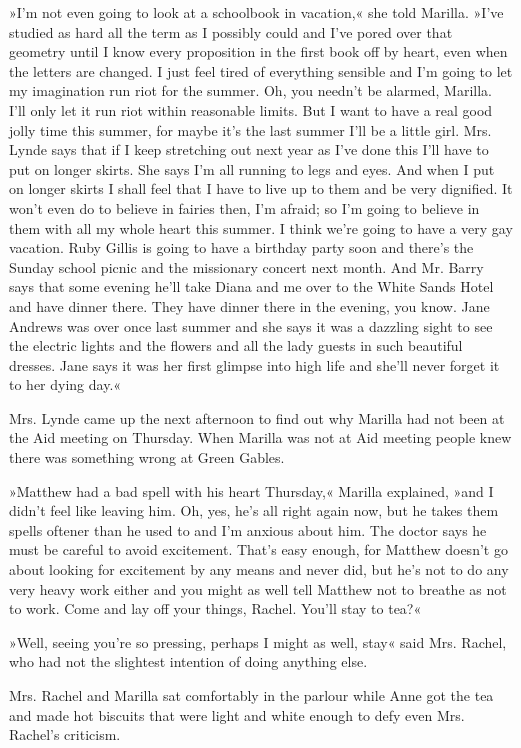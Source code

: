 »I’m not even going to look at a schoolbook in vacation,« she told Marilla. »I’ve studied as hard all the term as I possibly could and I’ve pored over that geometry until I know every proposition in the first book off by heart, even when the letters are changed. I just feel tired of everything sensible and I’m going to let my imagination run riot for the summer. Oh, you needn’t be alarmed, Marilla. I’ll only let it run riot within reasonable limits. But I want to have a real good jolly time this summer, for maybe it’s the last summer I’ll be a little girl. Mrs. Lynde says that if I keep stretching out next year as I’ve done this I’ll have to put on longer skirts. She says I’m all running to legs and eyes. And when I put on longer skirts I shall feel that I have to live up to them and be very dignified. It won’t even do to believe in fairies then, I’m afraid; so I’m going to believe in them with all my whole heart this summer. I think we’re going to have a very gay vacation. Ruby Gillis is going to have a birthday party soon and there’s the Sunday school picnic and the missionary concert next month. And Mr. Barry says that some evening he’ll take Diana and me over to the White Sands Hotel and have dinner there. They have dinner there in the evening, you know. Jane Andrews was over once last summer and she says it was a dazzling sight to see the electric lights and the flowers and all the lady guests in such beautiful dresses. Jane says it was her first glimpse into high life and she’ll never forget it to her dying day.«

Mrs. Lynde came up the next afternoon to find out why Marilla had not been at the Aid meeting on Thursday. When Marilla was not at Aid meeting people knew there was something wrong at Green Gables.

»Matthew had a bad spell with his heart Thursday,« Marilla explained, »and I didn’t feel like leaving him. Oh, yes, he’s all right again now, but he takes them spells oftener than he used to and I’m anxious about him. The doctor says he must be careful to avoid excitement. That’s easy enough, for Matthew doesn’t go about looking for excitement by any means and never did, but he’s not to do any very heavy work either and you might as well tell Matthew not to breathe as not to work. Come and lay off your things, Rachel. You’ll stay to tea?«

»Well, seeing you’re so pressing, perhaps I might as well, stay« said Mrs. Rachel, who had not the slightest intention of doing anything else.

Mrs. Rachel and Marilla sat comfortably in the parlour while Anne got the tea and made hot biscuits that were light and white enough to defy even Mrs. Rachel’s criticism.

